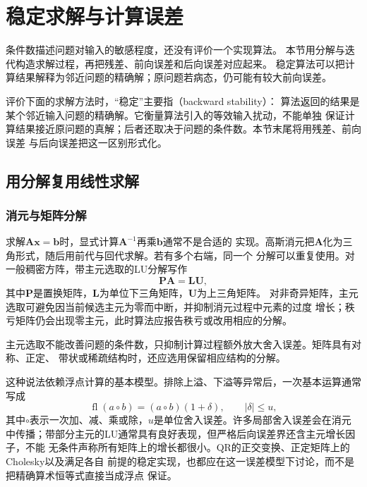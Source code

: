 \section{稳定求解与计算误差}
\label{sec:matrix-analysis-stable-solvers}

条件数描述问题对输入的敏感程度，还没有评价一个实现算法。
本节用分解与迭代构造求解过程，再把残差、前向误差和后向误差对应起来。
稳定算法可以把计算结果解释为邻近问题的精确解；原问题若病态，仍可能有较大前向误差。

评价下面的求解方法时，“稳定”主要指（backward stability）：
算法返回的结果是某个邻近输入问题的精确解。它衡量算法引入的等效输入扰动，不能单独
保证计算结果接近原问题的真解；后者还取决于问题的条件数。本节末尾将用残差、前向误差
与后向误差把这一区别形式化。

\subsection{用分解复用线性求解}

\subsubsection{消元与矩阵分解}

求解$\bm{A}\bm{x}=\bm{b}$时，显式计算$\bm{A}^{-1}$再乘$\bm{b}$通常不是合适的
实现。高斯消元把$\bm{A}$化为三角形式，随后用前代与回代求解。若有多个右端，同一个
分解可以重复使用。对一般稠密方阵，带主元选取的LU分解写作
\begin{equation}
  \bm{P}\bm{A}=\bm{L}\bm{U},
  \label{eq:matrix-analysis-palu}
\end{equation}
其中$\bm{P}$是置换矩阵，$\bm{L}$为单位下三角矩阵，$\bm{U}$为上三角矩阵。
对非奇异矩阵，主元选取可避免因当前候选主元为零而中断，并抑制消元过程中元素的过度
增长；秩亏矩阵仍会出现零主元，此时算法应报告秩亏或改用相应的分解。

主元选取不能改善问题的条件数，只抑制计算过程额外放大舍入误差。矩阵具有对称、正定、
带状或稀疏结构时，还应选用保留相应结构的分解。

这种说法依赖浮点计算的基本模型。排除上溢、下溢等异常后，一次基本运算通常写成
\[
  \operatorname{fl}(a\mathbin{\circ}b)
  =(a\mathbin{\circ}b)(1+\delta),
  \qquad |\delta|\leq u,
\]
其中$\circ$表示一次加、减、乘或除，$u$是单位舍入误差。许多局部舍入误差会在消元
中传播；带部分主元的LU通常具有良好表现，但严格后向误差界还含主元增长因子，不能
无条件声称所有矩阵上的增长都很小。QR的正交变换、正定矩阵上的Cholesky以及满足各自
前提的稳定实现，也都应在这一误差模型下讨论，而不是把精确算术恒等式直接当成浮点
保证。

